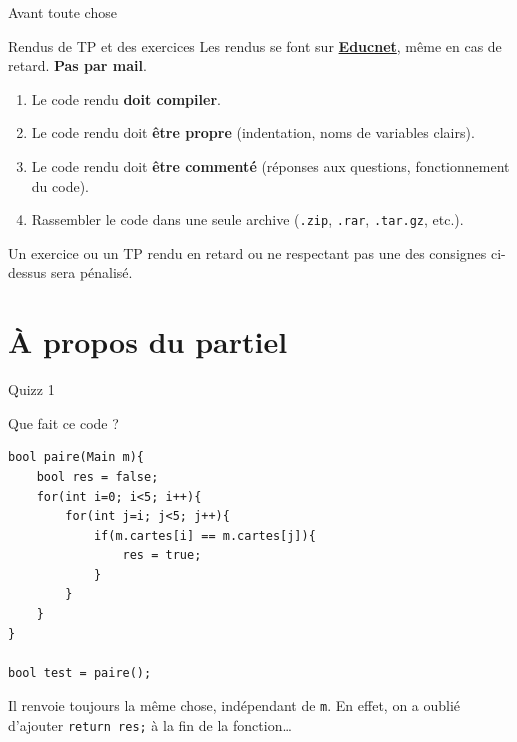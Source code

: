 
\author[nicolas.audebert@onera.fr]{Nicolas Audebert}
\date[1 déc. 2017]{Vendredi 1\textsuperscript{er} décembre 2017}
\subtitle{Chaînes de caractères - Fichiers}
\maketitle

\begin{frame}{Avant toute chose}
  \begin{alertblock}{Rendus de TP et des exercices}
  Les rendus se font sur \href{https://educnet.enpc.fr}{\textbf{Educnet}}, même en cas de retard. \textbf{Pas par mail}.
  \begin{enumerate}
  	\item Le code rendu \textbf{doit compiler}.
    \item Le code rendu doit \textbf{être propre} (indentation, noms de variables clairs).
    \item Le code rendu doit \textbf{être commenté} (réponses aux questions, fonctionnement du code).
    \item Rassembler le code dans une seule archive (\texttt{.zip}, \texttt{.rar}, \texttt{.tar.gz}, etc.).
  \end{enumerate}
  Un exercice ou un TP rendu en retard ou ne respectant pas une des consignes ci-dessus sera pénalisé.
  \end{alertblock}
\end{frame}

\section{À propos du partiel}

\begin{frame}[fragile]{Quizz 1}

Que fait ce code ?

\begin{verbatim}
bool paire(Main m){
    bool res = false;
    for(int i=0; i<5; i++){
        for(int j=i; j<5; j++){
            if(m.cartes[i] == m.cartes[j]){
                res = true;
            }
        }
    }
}

bool test = paire();
\end{verbatim}

{Il renvoie toujours la même chose, indépendant de \texttt{m}. En effet, on a oublié d'ajouter \texttt{return res;} à la fin de la fonction\dots}
\end{frame}

